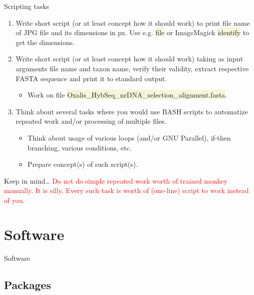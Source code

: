 \documentclass[compress, xelatex, 11pt, xcolor=svgnames, aspectratio=169, url={hyphens, lowtilde}]{beamer}
\renewcommand{\texttt}[1]{\colorbox{Beige}{{\ttfamily #1}}}
\renewcommand{\alert}[1]{\textcolor{red}{#1}}
\begin{document}
\begin{frame}{Scripting tasks}
	\begin{enumerate}
		\item Write short script (or at least concept how it should work) to print file name of JPG file and its dimensions in px. Use e.g. \texttt{file} or ImageMagick \texttt{identify} to get the dimensions.
		\item Write short script (or at least concept how it should work) taking as input arguments file name and taxon name, verify their validity, extract respective FASTA sequence and print it to standard output.
		\begin{itemize}
			\item Work on file \texttt{Oxalis\_HybSeq\_nrDNA\_selection\_alignment.fasta}.
		\end{itemize}
		\item Think about several tasks where you would use BASH scripts to automatize repeated work and/or processing of multiple files.
		\begin{itemize}
			\item Think about usage of various loops (and/or GNU Parallel), if-then branching, various conditions, etc.
			\item Prepare concept(s) of such script(s).
		\end{itemize}
	\end{enumerate}
	\begin{block}{Keep in mind\ldots}
		\alert{Do not do simple repeated work worth of trained monkey manually. It is silly. Every such task is worth of (one-line) script to work instead of you.}
	\end{block}
\end{frame}

\section{Software}

\begin{frame}{Software}
	\tableofcontents[currentsection, sectionstyle=show/hide, hideothersubsections]
\end{frame}

\subsection{Packages}
\end{document}
